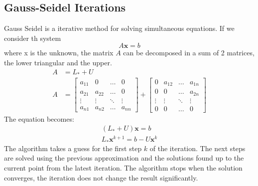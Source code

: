 \documentclass[12pt,a4paper,twoside]{report}
\begin{document}
\subsection{Gauss-Seidel Iterations} \label{GaussSeidel}
Gauss Seidel is a iterative method for solving simultaneous equations. If we consider th system 
\begin{equation}
A\boldsymbol{x} = b
\end{equation}
where x is the unknown, the matrix $A$ can be decomposed in a sum of 2 matrices, the lower triangular and the upper.
\begin{equation}
	\begin{split}
	A &= L_* +U \\
	A &= \begin{bmatrix}
	a_{11} &  0  & \ldots & 0\\
	a_{21} &  a_{22} & \ldots & 0\\
	\vdots & \vdots & \ddots & \vdots\\
	a_{n1} &  a_{n2}       &\ldots & a_{nn}
	\end{bmatrix}  
	+  \begin{bmatrix}
	0 &  a_{12}  & \ldots & a_{1n}\\
	0 &  0 & \ldots &a_{2n}\\
	\vdots & \vdots & \ddots & \vdots\\
	0 &  0  &\ldots & 0
	\end{bmatrix} 
 	\end{split}
\end{equation}
	The equation becomes:
\begin{equation}
\begin{split}
	(L_*+U)\boldsymbol{x} = b\\
	L_*\boldsymbol{x}^{k+1} = b - U\boldsymbol{x}^{k}
\end{split}
\end{equation}
The algorithm takes a guess for the first step  $k$ of the iteration. The next steps are solved using the previous approximation and the solutions found up to the current point from the latest iteration. The algorithm stops when the solution converges, the iteration does not change the result significantly.
\end{document}
